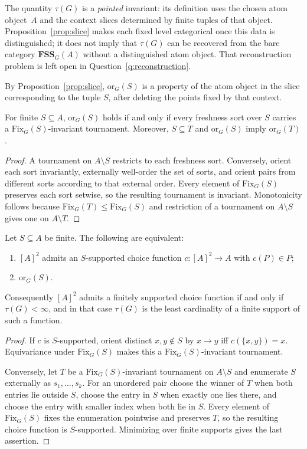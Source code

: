 \documentclass{lmcs}
\newcommand{\Fix}{\mathrm{Fix}}
\newcommand{\FSS}{\mathbf{FSS}}
\begin{document}
The quantity $\tau(G)$ is a \emph{pointed} invariant: its definition uses
the chosen atom object~$A$ and the context slices determined by finite tuples
of that object. Proposition~\ref{prop:slice} makes each fixed level
categorical once this data is distinguished; it does not imply that
$\tau(G)$ can be recovered from the bare category $\FSS_G(A)$ without a
distinguished atom object. That reconstruction problem is left open in
Question~\ref{q:reconstruction}.

By Proposition~\ref{prop:slice}, $\mathrm{or}_G(S)$ is a property of the
atom object in the slice corresponding to the tuple $S$, after deleting
the points fixed by that context.

\begin{thm}
\label{thm:ctxsorts}
For finite $S\subseteq A$, $\mathrm{or}_G(S)$ holds if and only if every
freshness sort over $S$ carries a $\Fix_G(S)$-invariant tournament.
Moreover, $S\subseteq T$ and $\mathrm{or}_G(S)$ imply
$\mathrm{or}_G(T)$.
\end{thm}
\begin{proof}
A tournament on $A\setminus S$ restricts to each freshness sort. Conversely,
orient each sort invariantly, externally well-order the set of sorts, and
orient pairs from different sorts according to that external order. Every
element of $\Fix_G(S)$ preserves each sort setwise, so the resulting
tournament is invariant. Monotonicity follows because
$\Fix_G(T)\leq\Fix_G(S)$ and restriction of a tournament on
$A\setminus S$ gives one on $A\setminus T$.
\end{proof}

\begin{thm}
\label{thm:pairchoice}
Let $S\subseteq A$ be finite. The following are equivalent:
\begin{enumerate}[label=\textup{(\roman*)}]
\item $[A]^2$ admits an $S$-supported choice function
$c:[A]^2\to A$ with $c(P)\in P$;
\item $\mathrm{or}_G(S)$.
\end{enumerate}
Consequently $[A]^2$ admits a finitely supported choice function if and
only if $\tau(G)<\infty$, and in that case $\tau(G)$ is the least
cardinality of a finite support of such a function.
\end{thm}
\begin{proof}
If $c$ is $S$-supported, orient distinct $x,y\notin S$ by
$x\to y$ iff $c(\{x,y\})=x$. Equivariance under $\Fix_G(S)$ makes this
a $\Fix_G(S)$-invariant tournament.

Conversely, let $T$ be a $\Fix_G(S)$-invariant tournament on
$A\setminus S$ and enumerate $S$ externally as $s_1,\ldots,s_k$. For an
unordered pair choose the winner of $T$ when both entries lie outside
$S$, choose the entry in $S$ when exactly one lies there, and choose the
entry with smaller index when both lie in $S$. Every element of
$\Fix_G(S)$ fixes the enumeration pointwise and preserves $T$, so the
resulting choice function is $S$-supported. Minimizing over finite supports
gives the last assertion.
\end{proof}
\end{document}
